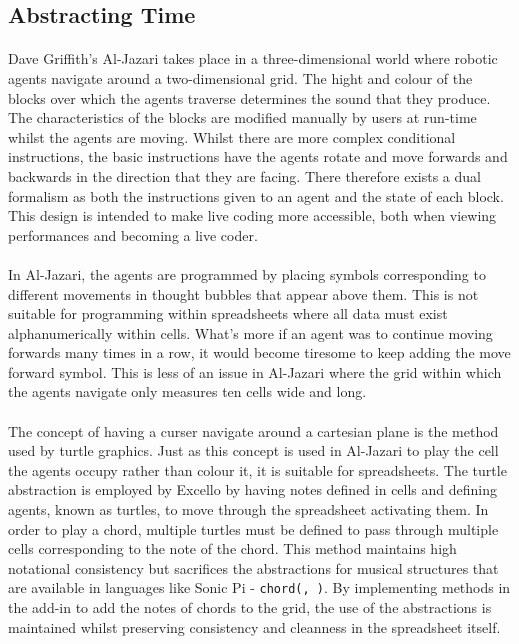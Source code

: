 \subsection{Abstracting Time}

\paragraph{} Dave Griffith's Al-Jazari \cite{mclean:visualisation} takes place in a three-dimensional world where robotic agents navigate around a two-dimensional grid. The hight and colour of the blocks over which the agents traverse determines the sound that they produce. The characteristics of the blocks are modified manually by users at run-time whilst the agents are moving. Whilst there are more complex conditional instructions, the basic instructions have the agents rotate and move forwards and backwards in the direction that they are facing. There therefore exists a dual formalism as both the instructions given to an agent and the state of each block. This design is intended to make live coding more accessible, both when viewing performances and becoming a live coder.

\paragraph{} In Al-Jazari, the agents are programmed by placing symbols corresponding to different movements in thought bubbles that appear above them. This is not suitable for programming within spreadsheets where all data must exist alphanumerically within cells. What's more if an agent was to continue moving forwards many times in a row, it would become tiresome to keep adding the move forward symbol. This is less of an issue in Al-Jazari where the grid within which the agents navigate only measures ten cells wide and long.

\paragraph{} The concept of having a curser navigate around a cartesian plane is the method used by turtle graphics. Just as this concept is used in Al-Jazari to play the cell the agents occupy rather than colour it, it is suitable for spreadsheets. The turtle abstraction is employed by Excello by having notes defined in cells and defining agents, known as turtles, to move through the spreadsheet activating them. In order to play a chord, multiple turtles must be defined to pass through multiple cells corresponding to the note of the chord. This method maintains high notational consistency but sacrifices the abstractions for musical structures that are available in languages like Sonic Pi - \texttt{chord(, )}. By implementing methods in the add-in to add the notes of chords to the grid, the use of the abstractions is maintained whilst preserving consistency and cleanness in the spreadsheet itself.

